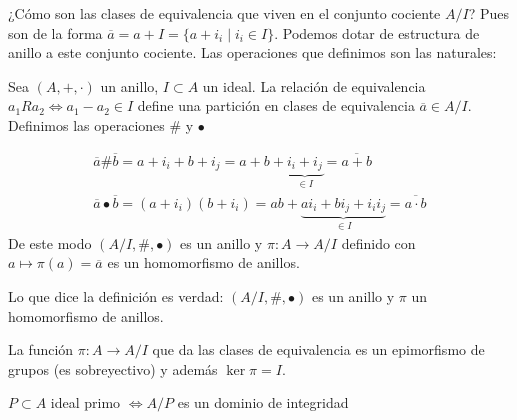 ¿Cómo son las clases de equivalencia que viven en el conjunto cociente $A/I$? Pues son de la forma $\overline{a} = a + I = \{a + i_i \mid i_i \in I\}$. Podemos dotar de estructura de anillo a este conjunto cociente. Las operaciones que definimos son las naturales:

\begin{dfn}
	Sea $(A, +, \cdot)$ un anillo, $I \subset A$ un ideal. La relación de equivalencia $a_1 R a_2 \iff a_1 - a_2 \in I$ define una partición en clases de equivalencia $\overline{a} \in A/I$. Definimos las operaciones $\#$ y $\bullet$
	
	\begin{align}
		\overline{a} \# \overline{b} = a + i_i + b + i_j = a+b + \underbrace{i_i + i_j}_{\in I} = \overline{a+b} \\
		\overline{a}\bullet\overline{b} = (a+i_i)(b+i_i) = ab + \underbrace{a i_i + b i_j + i_i i_j}_{\in I} = \overline{a \cdot b}
	\end{align}
	De este modo $(A/I, \#, \bullet)$ es un anillo y $\pi: A \to A/I$ definido con $a \mapsto \pi(a) = \overline{a}$ es un homomorfismo de anillos.
\end{dfn}

\begin{pro}
	Lo que dice la definición es verdad: $(A/I, \#, \bullet)$ es un anillo y $\pi$ un homomorfismo de anillos.
\end{pro}

\begin{pro}
	La función $\pi: A \to A/I$ que da las clases de equivalencia es un epimorfismo de grupos (es sobreyectivo) y además $\ker \pi = I$.
\end{pro}

\begin{pro}
	$P \subset A$ ideal primo $\iff A/P$ es un dominio de integridad
\end{pro}

\begin{figure}[h]
	\centering
\end{figure}

